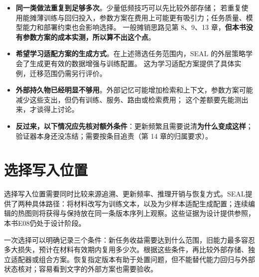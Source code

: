 \begin{itemize}
  \item \textbf{同一类做法重复到足够多次}。少量低频技巧可以先比较外部存储；
        若重复使用能摊薄训练与回归投入，参数方案在费用上可能更有吸引力；任务质量、模型能力和部署约束也会影响选择。
        一般摊销思路见第 8、9、13 章，\textbf{但本书没有参数方案的成本实测，所以算不出这个点}。
  \item \textbf{希望学习适配方案的生成方式}。在上述筛选任务范围内，SEAL 的外层策略学会了生成更有效的数据增强与训练配置。
        这为学习适配方案提供了具体实例，迁移范围仍需另行评价。
  \item \textbf{外部持久物已经明显不够用}。外部记忆可能增加检索和上下文，参数方案可能减少这些支出，但仍有训练、服务、路由或检索费用；
        这个差额要先能测出来，才谈得上讨论。
  \item \textbf{反过来，以下情况应先核对额外条件}：更新频繁且需要说清\textbf{为什么变成这样}；
        验证器本身还没冻结；需要按条目追责（第 14 章的归属要求）。
\end{itemize}

\section{选择写入位置}
\label{sec:ch10-claims}

选择写入位置需要同时比较来源追溯、更新频率、推理开销与恢复方式。SEAL提供了两种具体路径：将材料改写为训练文本，以及为少样本适配生成配置；连续编辑的热图则将获得与保持放在同一条版本序列上观察。这些证据为设计提供参照，本书E08仍处于设计阶段。

一次选择可以明确记录三个条件：新任务收益需要达到什么范围，旧能力最多容忍多大损失，预计在材料有效期内复用多少次。根据这些条件，再比较外部存储、独立适配器或组合方案。恢复指定版本有助于处置问题，但不能替代能力回归与外部状态核对；容易看到文字的外部方案也需要验收。



